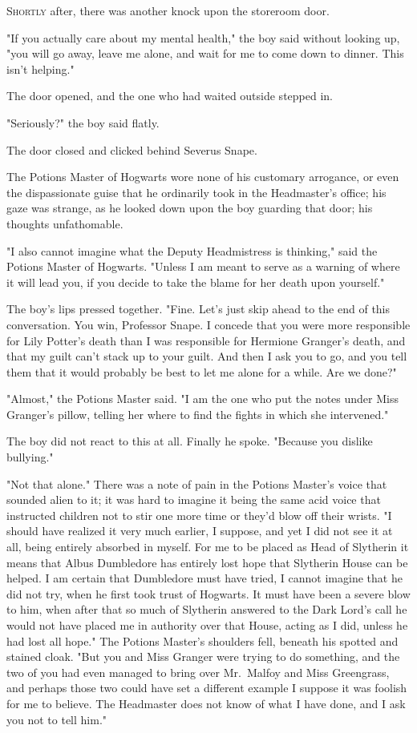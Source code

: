 
\lettrine{S}{hortly} after, there was another knock upon the storeroom door.

"If you actually care about my mental health," the boy said without looking up,
"you will go away, leave me alone, and wait for me to come down to dinner. This
isn't helping."

The door opened, and the one who had waited outside stepped in.

"Seriously?" the boy said flatly.

The door closed and clicked behind Severus Snape.

The Potions Master of Hogwarts wore none of his customary arrogance, or even
the dispassionate guise that he ordinarily took in the Headmaster's office; his
gaze was strange, as he looked down upon the boy guarding that door; his
thoughts unfathomable.

"I also cannot imagine what the Deputy Headmistress is thinking," said the
Potions Master of Hogwarts. "Unless I am meant to serve as a warning of where
it will lead you, if you decide to take the blame for her death upon yourself."

The boy's lips pressed together. "Fine. Let's just skip ahead to the end of
this conversation. You win, Professor Snape. I concede that you were more
responsible for Lily Potter's death than I was responsible for Hermione
Granger's death, and that my guilt can't stack up to your guilt. And then I ask
you to go, and you tell them that it would probably be best to let me alone for
a while. Are we done?"

"Almost," the Potions Master said. "I am the one who put the notes under Miss
Granger's pillow, telling her where to find the fights in which she intervened."

The boy did not react to this at all. Finally he spoke. "Because you dislike
bullying."

"Not that alone." There was a note of pain in the Potions Master's voice that
sounded alien to it; it was hard to imagine it being the same acid voice that
instructed children not to stir one more time or they'd blow off their wrists.
"I should have realized it{\el} very much earlier, I suppose, and yet I did
not see it at all, being entirely absorbed in myself. For me to be placed as
Head of Slytherin{\el} it means that Albus Dumbledore has entirely lost hope
that Slytherin House can be helped. I am certain that Dumbledore must have
tried, I cannot imagine that he did not try, when he first took trust of
Hogwarts. It must have been a severe blow to him, when after that so much of
Slytherin answered to the Dark Lord's call{\el} he would not have placed me
in authority over that House, acting as I did, unless he had lost all hope."
The Potions Master's shoulders fell, beneath his spotted and stained cloak.
"But you and Miss Granger were trying to do something, and the two of you had
even managed to bring over Mr.~Malfoy and Miss Greengrass, and perhaps those
two could have set a different example{\el} I suppose it was foolish for me
to believe. The Headmaster does not know of what I have done, and I ask you not
to tell him."


